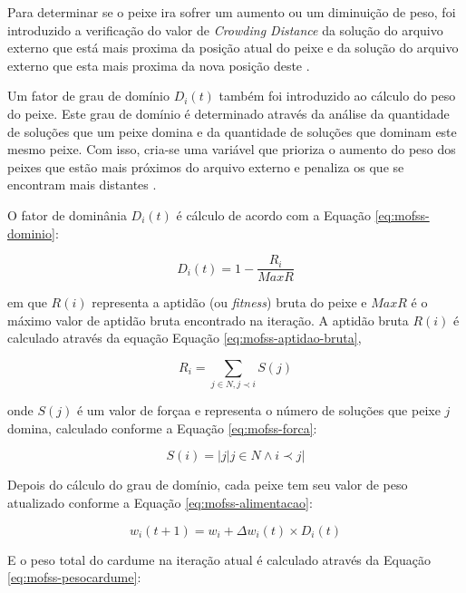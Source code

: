 Para determinar se o peixe ira sofrer um aumento ou um diminuição de peso, foi introduzido a verificação do valor de \textit{Crowding Distance} da solução do arquivo externo que está mais proxima da posição atual do peixe e da solução do arquivo externo que esta mais proxima da nova posição deste \cite{bastos2015multi}.

Um fator de grau de domínio $D_{i}(t)$ também foi introduzido ao cálculo do peso do peixe. Este grau de domínio é determinado através da análise da quantidade de soluções que um peixe domina e da quantidade de soluções que dominam este mesmo peixe. Com isso, cria-se uma variável que prioriza o aumento do peso dos peixes que estão mais próximos do arquivo externo e penaliza os que se encontram mais distantes \cite{bastos2015multi}.

O fator de dominânia $D_{i}(t)$ é cálculo de acordo com a Equação \ref{eq:mofss-dominio}:

\begin{equation} \label{eq:mofss-dominio}
    D_{i}(t) = 1 - \frac{R_{i}}{MaxR}
\end{equation}

em que $R(i)$ representa a aptidão (ou \textit{fitness}) bruta do peixe e $MaxR$ é o máximo valor de aptidão bruta encontrado na iteração. A aptidão bruta $R(i)$ é calculado através da equação Equação \ref{eq:mofss-aptidao-bruta}, 

\begin{equation} \label{eq:mofss-aptidao-bruta}
    R_{i} = \sum_{j \in N, j \prec i} S(j)
\end{equation}

onde $S(j)$ é um valor de forçaa e representa o número de soluções que peixe $j$ domina, calculado conforme a Equação \ref{eq:mofss-forca}:

\begin{equation} \label{eq:mofss-forca}
    S(i) = |{j | j \in N \wedge i \prec j}|
\end{equation}

Depois do cálculo do grau de domínio, cada peixe tem seu valor de peso atualizado conforme a Equação \ref{eq:mofss-alimentacao}:

\begin{equation} \label{eq:mofss-alimentacao}
    w_{i}(t + 1) = w_{i} + \Delta w_{i}(t) \times D_{i}(t)
\end{equation}

E o peso total do cardume na iteração atual é calculado através da Equação \ref{eq:mofss-pesocardume}:

